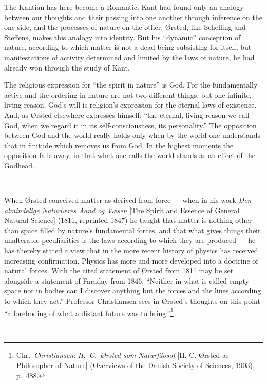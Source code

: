 \documentclass[12pt,a4paper]{book}
\newcommand{\opage}[1]{\marginnote{\footnotesize\textit{[#1]}}}
\begin{document}
The Kantian has here become a Romantic. Kant had found only an analogy between our
thoughts and their passing into one another through inference on the one side, and
the processes of nature on the other. Ørsted, like Schelling and Steffens, makes this
analogy into identity. But his ``dynamic'' conception of nature, according to which
matter is not a dead being subsisting for itself, but manifestations of activity
determined and limited by the laws of nature, he had already won through the study of
Kant.

The religious expression for ``the spirit in nature'' is God. For \opage{52}the fundamentally
active and the ordering in nature are not two different things, but one infinite,
living reason. God's will is religion's expression for the eternal laws of existence.
And, as Ørsted elsewhere expresses himself: ``the eternal, living reason we call God,
when we regard it in its self-consciousness, its personality.'' The opposition between
God and the world really holds only when by the world one understands that in
finitude which removes us from God. In the highest moments the opposition falls away,
in that what one calls the world stands as an effect of the Godhead.

\begin{center}---\end{center}

When Ørsted conceived matter as derived from force --- when in his work \emph{Den
almindelige Naturlæres Aand og Væsen} [The Spirit and Essence of General Natural
Science] (1811, reprinted 1847) he taught that matter is nothing other than space
filled by nature's fundamental forces, and that what gives things their unalterable
peculiarities is the laws according to which they are produced --- he has thereby
stated a view that in the more recent history of physics has received increasing
confirmation. Physics has more and more developed into a doctrine of natural forces.
With the cited statement of Ørsted from 1811 may be set alongside a statement of
Faraday from 1846: ``Neither in what is called empty space nor in bodies can I
discover anything but the forces and the lines according to which they act.''
Professor Christiansen sees in Ørsted's thoughts on this point ``a foreboding of what
a distant future was to bring.''\footnote{Chr.\ \emph{Christiansen}: \emph{H.\ C.\ Ørsted som
Naturfilosof} [H. C. Ørsted as Philosopher of Nature] (Overviews of the Danish
Society of Sciences, 1903), p.~488.}

\begin{center}---\end{center}
\end{document}
